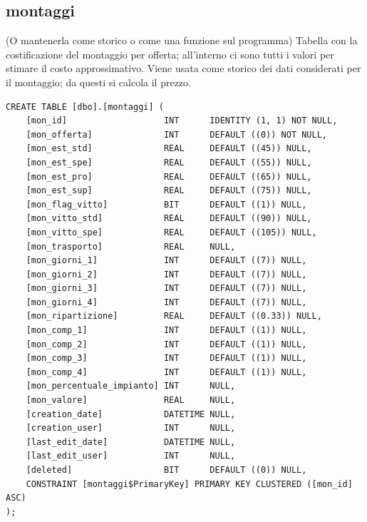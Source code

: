 \documentclass[12pt]{article}
\begin{document}
\subsection{montaggi} (O mantenerla come storico o come una funzione sul programma)
Tabella con la costificazione del montaggio per offerta; all'interno ci sono tutti i valori per stimare il costo approssimativo.
Viene usata come storico dei dati considerati per il montaggio; da questi si calcola il prezzo.
\begin{lstlisting}
CREATE TABLE [dbo].[montaggi] (
    [mon_id]                   INT      IDENTITY (1, 1) NOT NULL,
    [mon_offerta]              INT      DEFAULT ((0)) NOT NULL,
    [mon_est_std]              REAL     DEFAULT ((45)) NULL,
    [mon_est_spe]              REAL     DEFAULT ((55)) NULL,
    [mon_est_pro]              REAL     DEFAULT ((65)) NULL,
    [mon_est_sup]              REAL     DEFAULT ((75)) NULL,
    [mon_flag_vitto]           BIT      DEFAULT ((1)) NULL,
    [mon_vitto_std]            REAL     DEFAULT ((90)) NULL,
    [mon_vitto_spe]            REAL     DEFAULT ((105)) NULL,
    [mon_trasporto]            REAL     NULL,
    [mon_giorni_1]             INT      DEFAULT ((7)) NULL,
    [mon_giorni_2]             INT      DEFAULT ((7)) NULL,
    [mon_giorni_3]             INT      DEFAULT ((7)) NULL,
    [mon_giorni_4]             INT      DEFAULT ((7)) NULL,
    [mon_ripartizione]         REAL     DEFAULT ((0.33)) NULL,
    [mon_comp_1]               INT      DEFAULT ((1)) NULL,
    [mon_comp_2]               INT      DEFAULT ((1)) NULL,
    [mon_comp_3]               INT      DEFAULT ((1)) NULL,
    [mon_comp_4]               INT      DEFAULT ((1)) NULL,
    [mon_percentuale_impianto] INT      NULL,
    [mon_valore]               REAL     NULL,
    [creation_date]            DATETIME NULL,
    [creation_user]            INT      NULL,
    [last_edit_date]           DATETIME NULL,
    [last_edit_user]           INT      NULL,
    [deleted]                  BIT      DEFAULT ((0)) NULL,
    CONSTRAINT [montaggi$PrimaryKey] PRIMARY KEY CLUSTERED ([mon_id] ASC)
);
\end{lstlisting}
\end{document}
